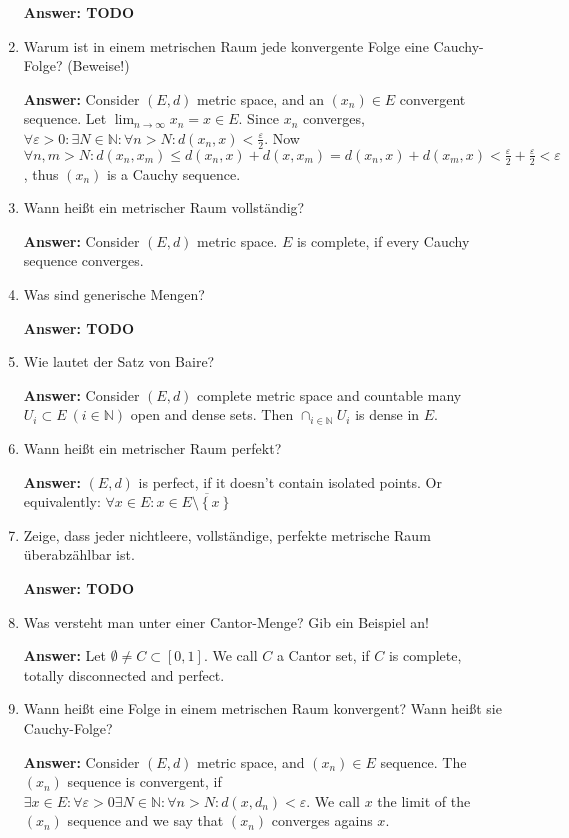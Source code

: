 \documentclass[11pt]{article}
\newcommand{\NN}[0]{\mathbb{N}}
\begin{document}
\begin{enumerate}
    \textbf{Answer: TODO}

    \item Warum ist in einem metrischen Raum jede konvergente Folge eine Cauchy-Folge? (Beweise!)

    \textbf{Answer:} Consider $(E, d)$ metric space, and an $(x_n) \in E$ convergent sequence. Let $\lim_{n \to \infty} x_n = x \in E$. Since $x_n$ converges, $\forall \varepsilon > 0\colon \exists N \in \NN\colon \forall n > N\colon d(x_n, x) < \frac{\varepsilon}{2}$. Now $\forall n, m > N\colon d(x_n, x_m) \le d(x_n, x) + d(x, x_m) = d(x_n, x) + d(x_m, x) < \frac{\varepsilon}{2} + \frac{\varepsilon}{2} < \varepsilon$, thus $(x_n)$ is a Cauchy sequence.

    \item Wann heißt ein metrischer Raum vollständig?

    \textbf{Answer:} Consider $(E, d)$ metric space. $E$ is complete, if every Cauchy sequence converges.

    \item Was sind generische Mengen?

    \textbf{Answer: TODO}
    \item Wie lautet der Satz von Baire?

    \textbf{Answer:} Consider $(E, d)$ complete metric space and countable many $U_i \subset E~(i \in \mathbb{N})$ open and dense sets. Then $\cap_{i \in \NN} U_i$ is dense in $E$.

    \item Wann heißt ein metrischer Raum perfekt?

    \textbf{Answer:} $(E, d)$ is perfect, if it doesn't contain isolated points. Or equivalently: $\forall x \in E\colon x \in \overline{E \setminus \left\{x\right\}}$

    \item Zeige, dass jeder nichtleere, vollständige, perfekte metrische Raum überabzählbar ist.

    \textbf{Answer: TODO}
    \item Was versteht man unter einer Cantor-Menge? Gib ein Beispiel an!

    \textbf{Answer:} Let $\emptyset \neq C \subset [0, 1]$. We call $C$ a Cantor set, if $C$ is complete, totally disconnected and perfect.

    \item Wann heißt eine Folge in einem metrischen Raum konvergent? Wann heißt sie Cauchy-Folge?

    \textbf{Answer:} Consider $(E, d)$ metric space, and $(x_n) \in E$ sequence. The $(x_n)$ sequence is convergent, if $\exists x\in E\colon \forall \varepsilon > 0\exists N \in \NN\colon \forall n > N\colon d(x, d_n) < \varepsilon$. We call $x$ the limit of the $(x_n)$ sequence and we say that $(x_n)$ converges agains $x$.


\end{enumerate}
\end{document}

